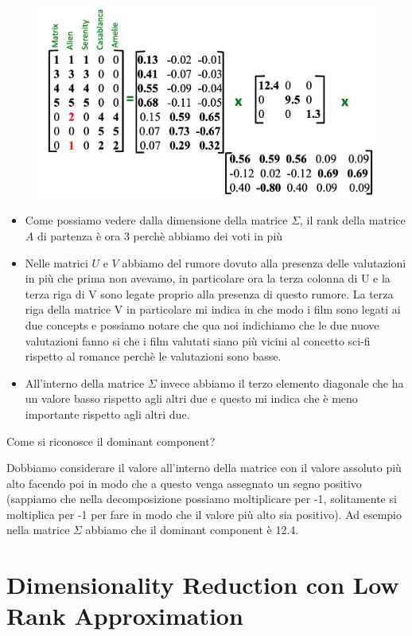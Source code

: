\documentclass[14pt]{extreport}
\begin{document}
\begin{figure}[H] 
\centering
\includegraphics[width=0.7\linewidth]{499.jpeg}
\end{figure}

\begin{itemize}
	\item Come possiamo vedere dalla dimensione della matrice $\Sigma$, il rank della matrice $A$ di partenza è ora 3 perchè abbiamo dei voti in più
	\item Nelle matrici $U$ e $V$ abbiamo del rumore dovuto alla presenza delle valutazioni in più che prima non avevamo, in particolare ora la terza colonna di U 
	e la terza riga di V sono legate proprio alla presenza di questo rumore. La terza riga della matrice V in particolare mi indica in che modo i film sono legati 
	ai due concepts e possiamo notare che qua noi indichiamo che le due nuove valutazioni fanno si che i film valutati siano più vicini al concetto sci-fi rispetto 
	al romance perchè le valutazioni sono basse.
	\item All'interno della matrice $\Sigma$ invece abbiamo il terzo elemento diagonale che ha un valore basso rispetto agli altri due e questo mi indica che è meno 
	importante rispetto agli altri due.
\end{itemize}

Come si riconosce il dominant component?

Dobbiamo considerare il valore all'interno della matrice con il valore assoluto più alto facendo poi in modo che a questo venga assegnato un segno positivo (sappiamo
che nella decomposizione possiamo moltiplicare per -1, solitamente si moltiplica per -1 per fare in modo che il valore più alto sia positivo). 
Ad esempio nella matrice $\Sigma$ abbiamo che il dominant component è 12.4.

\section{Dimensionality Reduction con Low Rank Approximation}
\end{document}
